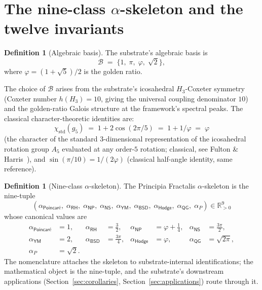 \documentclass[11pt,a4paper]{amsart}
\theoremstyle{plain}
\theoremstyle{definition}
\newtheorem{definition}[theorem]{Definition}
\begin{document}
\section{The nine-class $\alpha$-skeleton and the twelve invariants}\label{sec:alpha-skeleton}

\begin{definition}[Algebraic basis]\label{def:basis}
The substrate's algebraic basis is
\[
\mathcal{B} \;=\; \{1,\; \pi,\; \varphi,\; \sqrt{2}\},
\]
where $\varphi = (1 + \sqrt{5})/2$ is the golden ratio.
\end{definition}

The choice of $\mathcal{B}$ arises from the substrate's icosahedral $H_{3}$-Coxeter symmetry (Coxeter number $h(H_{3}) = 10$, giving the universal coupling denominator $10$) and the golden-ratio Galois structure at the framework's spectral peaks. The classical character-theoretic identities are:
\[
\chi_{\mathrm{std}}(g_{5}) \;=\; 1 + 2\cos(2\pi/5) \;=\; 1 + 1/\varphi \;=\; \varphi
\]
(the character of the standard $3$-dimensional representation of the icosahedral rotation group $A_{5}$ evaluated at any order-$5$ rotation; classical, see Fulton \& Harris~\cite{fulton-harris1991}), and $\sin(\pi/10) = 1/(2\varphi)$ (classical half-angle identity, same reference).

\begin{definition}[Nine-class $\alpha$-skeleton]\label{def:alpha-skeleton}
The Principia Fractalis $\alpha$-skeleton is the nine-tuple
\[
(\alpha_{\textsf{Poincar\'e}},\; \alpha_{\textsf{RH}},\; \alpha_{\textsf{NP}},\; \alpha_{\textsf{NS}},\; \alpha_{\textsf{YM}},\; \alpha_{\textsf{BSD}},\; \alpha_{\textsf{Hodge}},\; \alpha_{\textsf{QG}},\; \alpha_{P}) \in \mathbb{R}_{>0}^{9}
\]
whose canonical values are
\begin{align*}
\alpha_{\textsf{Poincar\'e}} &= 1, & \alpha_{\textsf{RH}} &= \tfrac{3}{2}, & \alpha_{\textsf{NP}} &= \varphi + \tfrac{1}{4}, & \alpha_{\textsf{NS}} &= \tfrac{3\pi}{2},\\
\alpha_{\textsf{YM}} &= 2, & \alpha_{\textsf{BSD}} &= \tfrac{3\pi}{4}, & \alpha_{\textsf{Hodge}} &= \varphi, & \alpha_{\textsf{QG}} &= \sqrt{2\pi},\\
\alpha_{P} &= \sqrt{2}. & & & & & &
\end{align*}
The nomenclature attaches the skeleton to substrate-internal identifications; the mathematical object is the nine-tuple, and the substrate's downstream applications (Section~\ref{sec:corollaries}, Section~\ref{sec:applications}) route through it.
\end{definition}
\end{document}
